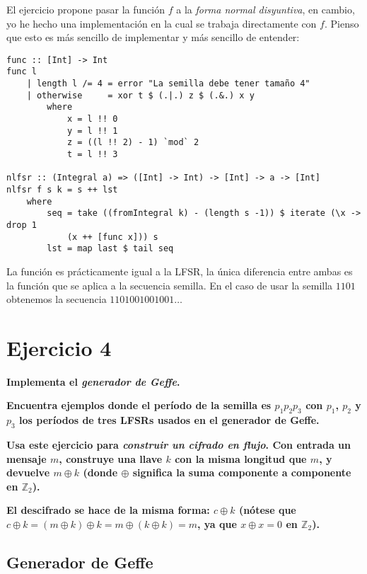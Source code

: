 \documentclass[10pt,spanish]{article}
\begin{document}
El ejercicio propone pasar la función $f$ a la \textit{\textcolor{azul}{forma normal disyuntiva}}, en cambio, yo he hecho una implementación en la cual se trabaja directamente con $f$. Pienso que esto es más sencillo de implementar y más sencillo de entender:

\begin{verbatim}
func :: [Int] -> Int
func l
    | length l /= 4 = error "La semilla debe tener tamaño 4"
    | otherwise     = xor t $ (.|.) z $ (.&.) x y
        where
            x = l !! 0
            y = l !! 1
            z = ((l !! 2) - 1) `mod` 2
            t = l !! 3

nlfsr :: (Integral a) => ([Int] -> Int) -> [Int] -> a -> [Int]
nlfsr f s k = s ++ lst
    where
        seq = take ((fromIntegral k) - (length s -1)) $ iterate (\x -> drop 1 
            (x ++ [func x])) s
        lst = map last $ tail seq

\end{verbatim}

La función es prácticamente igual a la LFSR, la única diferencia entre ambas es la función que se aplica a la secuencia semilla. En el caso de usar la semilla $1101$ obtenemos la secuencia $1101001001001\ldots$

\section{\textcolor{azul}Ejercicio 4}
\textbf{Implementa el \textit{\textcolor{azul}{generador de Geffe}}.}

\textbf{Encuentra ejemplos donde el período de la semilla es $p_1 p_2 p_3$ con $p_1$, $p_2$ y $p_3$ los períodos de tres LFSRs usados en el generador de Geffe.}

\textbf{Usa este ejercicio para \textit{\textcolor{azul}{construir un cifrado en flujo}}. Con entrada un mensaje $m$, construye una llave $k$ con la misma longitud que $m$, y devuelve $m \oplus k$ (donde $\oplus$ significa la suma componente a componente en $\mathbb{Z}_2$).}

\textbf{El descifrado se hace de la misma forma: $c \oplus k$ (nótese que $c \oplus k = (m \oplus k) \oplus k = m \oplus (k \oplus k) = m$, ya que $x \oplus x = 0$ en $\mathbb{Z}_2$).}

\subsection{\textcolor{azul}Generador de Geffe}
\end{document}
